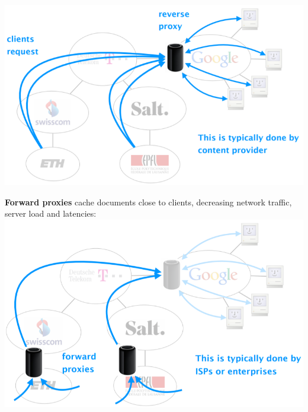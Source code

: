 \documentclass[a4paper, fontsize=8pt, landscape, DIV=1]{scrartcl}
\begin{document}
\begin{multicols*}{4}
		\includegraphics[width=\columnwidth]{images/Application_Layer/reverse_proxy.png}
		\par
		
		\textbf{Forward proxies} cache documents close to clients, decreasing network
		traffic, server load and latencies:\\
		
		\includegraphics[width=\columnwidth]{images/Application_Layer/forward_proxy.png}
		\par 
		

\end{multicols*}
\end{document}
